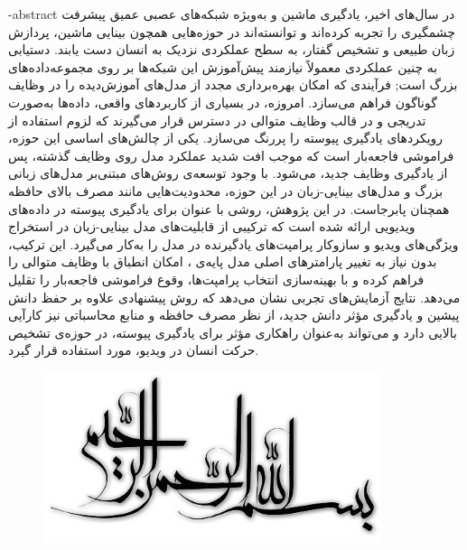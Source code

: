 \surname{}

\fa-abstract{
در سال‌های اخیر، یادگیری ماشین و به‌ویژه شبکه‌های عصبی عمیق پیشرفت چشمگیری را تجربه کرده‌اند و توانسته‌اند در حوزه‌هایی همچون بینایی ماشین، پردازش زبان طبیعی و تشخیص گفتار، به سطح عملکردی نزدیک به انسان دست یابند. دستیابی به چنین عملکردی معمولاً نیازمند پیش‌آموزش این شبکه‌ها بر روی مجموعه‌داده‌های بزرگ است; فرآیندی که امکان بهره‌برداری مجدد از مدل‌های آموزش‌دیده را در وظایف گوناگون فراهم می‌سازد.
امروزه، در بسیاری از کاربردهای واقعی، داده‌ها به‌صورت تدریجی و در قالب وظایف متوالی در دسترس قرار می‌گیرند که لزوم استفاده از رویکردهای یادگیری پیوسته را پررنگ می‌سازد. یکی از چالش‌های اساسی این حوزه، فراموشی فاجعه‌بار است که موجب افت شدید عملکرد مدل روی وظایف گذشته، پس از یادگیری وظایف جدید، می‌شود. با وجود توسعه‌ی روش‌های مبتنی‌بر مدل‌های زبانی بزرگ و مدل‌های بینایی-زبان در این حوزه، محدودیت‌هایی مانند مصرف بالای حافظه همچنان پابرجاست.
در این پژوهش، روشی با عنوان  برای یادگیری پیوسته در داده‌های ویدیویی ارائه شده است که ترکیبی از قابلیت‌های مدل بینایی-زبان  در استخراج ویژگی‌های ویدیو و سازوکار پرامپت‌های یادگیرنده در مدل  را به‌کار می‌گیرد. این ترکیب، بدون نیاز به تغییر پارامترهای اصلی مدل پایه‌ی ، امکان انطباق با وظایف متوالی را فراهم کرده و با بهینه‌سازی انتخاب پرامپت‌ها، وقوع فراموشی فاجعه‌بار را تقلیل می‌دهد. نتایج آزمایش‌های تجربی نشان می‌دهد که روش پیشنهادی علاوه بر حفظ دانش پیشین و یادگیری مؤثر دانش جدید، از نظر مصرف حافظه و منابع محاسباتی نیز کارآیی بالایی دارد و می‌تواند به‌عنوان راهکاری مؤثر برای یادگیری پیوسته، در حوزه‌ی تشخیص حرکت انسان در ویدیو، مورد استفاده قرار گیرد.
}





\AUTtitle
\vspace*{7cm}
\thispagestyle{empty}
\begin{center}
\includegraphics[height=5cm,width=12cm]{Images/besm.jpg}
\end{center}